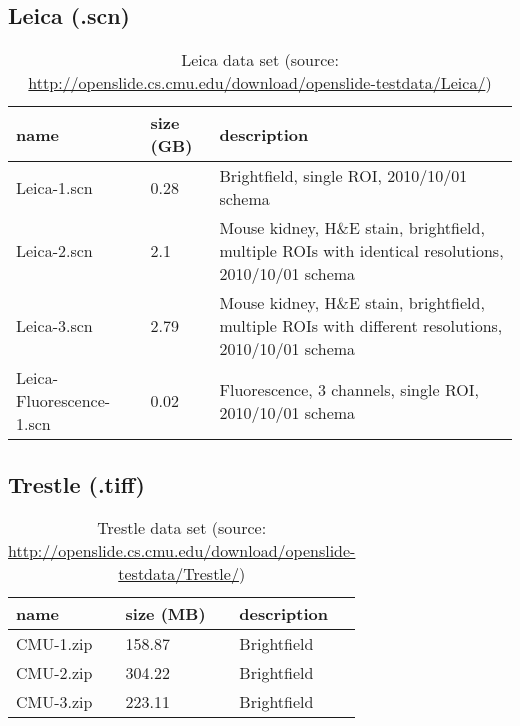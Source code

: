 \subsection{Leica (.scn)}

\begin{table}[H]
	\begin{center}
		\begin{tabular}{| p{4cm} | p{2cm} | p{5cm} |}
			\hline
			\textbf{name} & \textbf{size (GB)} & \textbf{description} \\ \hline
			Leica-1.scn & 0.28 & Brightfield, single ROI, 2010/10/01 schema \\ \hline
			Leica-2.scn & 2.1 & Mouse kidney, H\&E stain, brightfield, multiple ROIs with identical resolutions, 2010/10/01 schema \\ \hline
			Leica-3.scn	 & 2.79 & Mouse kidney, H\&E stain, brightfield, multiple ROIs with different resolutions, 2010/10/01 schema \\ \hline
			Leica-Fluorescence-1.scn & 0.02 & Fluorescence, 3 channels, single ROI, 2010/10/01 schema \\ \hline
		\end{tabular}
		\caption{Leica data set (source: \url{http://openslide.cs.cmu.edu/download/openslide-testdata/Leica/})}
	\end{center}
\end{table}


\subsection{Trestle (.tiff)}

\begin{table}[H]
	\begin{center}
		\begin{tabular}{| p{4cm} | p{2cm} | p{5cm} |}
			\hline
			\textbf{name} & \textbf{size (MB)} & \textbf{description} \\ \hline
			 CMU-1.zip & 158.87 & Brightfield \\ \hline
			 CMU-2.zip & 304.22 & Brightfield \\ \hline
			 CMU-3.zip & 223.11 & Brightfield \\ \hline
		\end{tabular}
		\caption{Trestle data set (source: \url{http://openslide.cs.cmu.edu/download/openslide-testdata/Trestle/})}
	\end{center}
\end{table}


